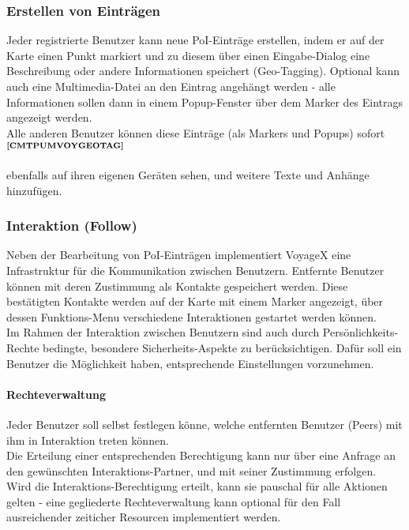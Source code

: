 \subsubsection{Erstellen von Einträgen}
Jeder registrierte Benutzer kann neue PoI-Einträge erstellen, indem er auf der Karte einen Punkt markiert und zu diesem über einen Eingabe-Dialog eine Beschreibung oder andere Informationen speichert (Geo-Tagging). Optional kann auch eine Multimedia-Datei an den Eintrag angehängt werden - alle Informationen sollen dann in einem Popup-Fenster über dem Marker des Eintrags angezeigt werden.\\
Alle anderen Benutzer können diese Einträge (als Markers und Popups) sofort$^{\textbf{\ref{CMTPUMVOYGEOTAG}}}$%
\addtocounter{footnote}{1}%
 ebenfalls auf ihren eigenen Geräten sehen, und weitere Texte und Anhänge hinzufügen.

\subsubsection{Interaktion (Follow)}
Neben der Bearbeitung von PoI-Einträgen implementiert VoyageX eine Infrastruktur für die Kommunikation zwischen Benutzern. Entfernte Benutzer können mit deren Zustimmung als Kontakte gespeichert werden. Diese bestätigten Kontakte werden auf der Karte mit einem Marker angezeigt, über dessen Funktions-Menu verschiedene Interaktionen gestartet werden können.\\
Im Rahmen der Interaktion zwischen Benutzern sind auch durch Persönlichkeits-Rechte bedingte, besondere Sicherheits-Aspekte zu berücksichtigen. Dafür soll ein Benutzer die Möglichkeit haben, entsprechende Einstellungen vorzunehmen.

\paragraph{Rechteverwaltung}
Jeder Benutzer soll selbst festlegen könne, welche entfernten Benutzer (Peers) mit ihm in Interaktion
treten können.\\
Die Erteilung einer entsprechenden Berechtigung kann nur über eine Anfrage an den gewünschten Interaktions-Partner, und mit seiner Zustimmung erfolgen. Wird die Interaktions-Berechtigung erteilt, kann sie pauschal für alle Aktionen gelten - eine gegliederte Rechteverwaltung kann optional für den Fall ausreichender zeiticher Resourcen implementiert werden.

